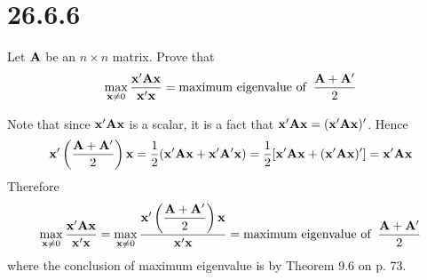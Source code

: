 \section*{26.6.6}
Let $\bf A$ be an $n\times n$ matrix.
Prove that
$$\max_{{\bf x}\ne0}
{{\bf x}'{\bf A}{\bf x}\over{\bf x}'{\bf x}}
=\hbox{maximum eigenvalue of}\;\;{{\bf A}+{\bf A}'\over 2}
$$

\bigskip
\noindent
Note that since ${\bf x}'{\bf Ax}$ is a scalar,
it is a fact that ${\bf x}'{\bf Ax}=({\bf x}'{\bf Ax})'$.
Hence
$${\bf x}'\left({\bf A}+{\bf A}'\over2\right){\bf x}
={1\over2}({\bf x}'{\bf A}{\bf x}+{\bf x}'{\bf A}'{\bf x})
={1\over2}[{\bf x}'{\bf A}{\bf x}+({\bf x}'{\bf A}{\bf x})']
={\bf x}'{\bf A}{\bf x}
$$
Therefore
$$\max_{{\bf x}\ne0}
{{\bf x}'{\bf A}{\bf x}\over{\bf x}'{\bf x}}
=\max_{{\bf x}\ne0}
{{\bf x}'\left(
\displaystyle{{\bf A}+{\bf A}'\over2}
\right){\bf x}\over{\bf x}'{\bf x}}
=\hbox{maximum eigenvalue of}\;\;{{\bf A}+{\bf A}'\over 2}
$$
where the conclusion of maximum eigenvalue is by Theorem 9.6
on p. 73.
